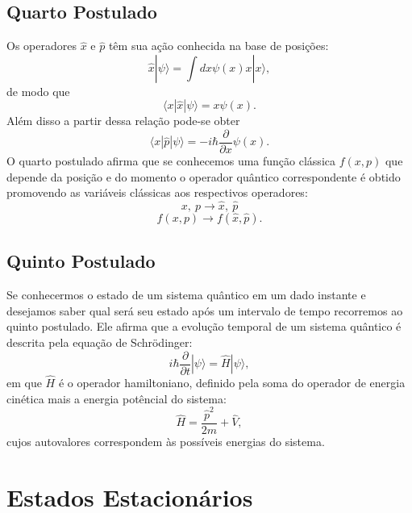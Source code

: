 \subsection{Quarto Postulado}

Os operadores $\hat{x}$ e $\hat{p}$ têm sua ação conhecida na base de posições:
\begin{equation}
\hat{x} |\psi\rangle = \int dx \psi(x) x |x \rangle,
\end{equation}
de modo que
\begin{equation}
\langle x|\hat{x} |\psi\rangle = x \psi(x).
\end{equation}
Além disso a partir dessa relação pode-se obter
\begin{equation}
\langle x|\hat{p} |\psi\rangle = -i\hbar \frac{\partial}{\partial x} \psi(x).
\end{equation}
O quarto postulado afirma que se conhecemos uma função clássica $f(x,p)$ que depende da posição e do momento o operador quântico correspondente é obtido promovendo as variáveis clássicas aos respectivos operadores:
\begin{equation}
x, ~p \longrightarrow \hat{x}, ~\hat{p}
\end{equation}
\begin{equation}
f(x,p) \longrightarrow f(\hat{x},\hat{p}).
\end{equation}

\subsection{Quinto Postulado}

Se conhecermos o estado de um sistema quântico em um dado instante e desejamos saber qual será seu estado após um intervalo de tempo recorremos ao quinto postulado. Ele afirma que a evolução temporal de um sistema quântico é descrita pela equação de Schrödinger:
\begin{equation}
i\hbar \frac{\partial}{\partial t}|\psi\rangle = \hat{H} |\psi\rangle,
\end{equation}
em que $\hat{H}$ é o operador hamiltoniano, definido pela soma do operador de energia cinética mais a energia potêncial do sistema:
\begin{equation}
\hat{H} = \frac{\hat{p}^2}{2m} + \hat{V},
\end{equation}
cujos autovalores correspondem às possíveis energias do sistema.

\section{Estados Estacionários}

